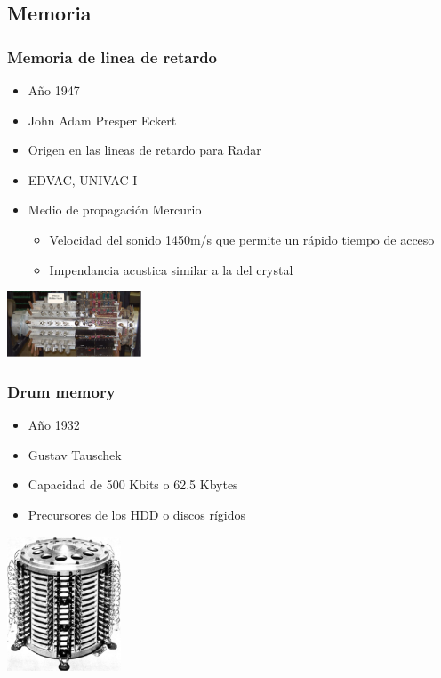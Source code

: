 \documentclass{beamer}
\begin{document}
\subsection{Memoria}
\begin{frame}
\frametitle{Memoria de linea de retardo}
\begin{minipage}[c]{7.5cm}
	\begin{itemize}
		\item Año 1947
		\item John Adam Presper Eckert
		\item Origen en las lineas de retardo para Radar
		\item EDVAC, UNIVAC I
		\item Medio de propagación Mercurio
			\begin{itemize}
				\item Velocidad del sonido 1450m/s que permite un rápido tiempo de acceso
				\item Impendancia acustica similar a la del crystal 
			\end{itemize}
	\end{itemize}
\end{minipage}
\begin{minipage}[t]{4cm}
	\begin{center}
		\includegraphics[width=4cm]{Mercury_memory.jpg}
	\end{center}
\end{minipage}
\end{frame}

\begin{frame}
\frametitle{Drum memory}
\begin{minipage}[b]{7.5cm}
	\begin{itemize}
		\item Año 1932
		\item Gustav Tauschek
		\item Capacidad de 500 Kbits o 62.5 Kbytes
		\item Precursores de los HDD o discos rígidos
	\end{itemize}
\end{minipage}
\begin{minipage}[c]{4cm}
	\begin{center}
		\includegraphics[height=4cm]{Pamiec_bebnowa_1.jpg}
	\end{center}
\end{minipage}
\end{frame}
\end{document}

